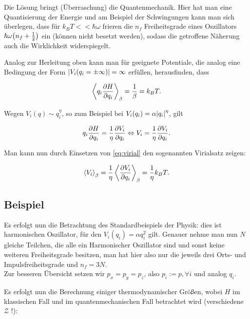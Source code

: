 \documentclass[../KlassMech_main.tex]{subfiles}
\begin{document}
Die Lösung bringt (Überraschung) die Quantenmechanik. Hier hat man eine Quantisierung der Energie und am Beispiel der Schwingungen kann man sich überlegen, dass für $k_B T << \hbar \omega$ frieren die $n_f$ Freiheitsgrade eines Oszillators $\hbar \omega \qty(n_f +\frac{1}{2})$ ein (können nicht besetzt werden), sodass die getroffene Näherung auch die Wirklichkeit widerspiegelt.


Analog zur Herleitung oben kann man für geeignete Potentiale, die analog eine Bedingung der Form $\abs{V_i(q_i = \pm\infty)} = \infty$ erfüllen, herausfinden, dass

\begin{equation}\label{eq:virial}
\expval{q_i \pdv{H}{q_i}}_\beta = \frac{1}{\beta} = k_B T .
\end{equation}

Wegen $V_i(q) \sim q_i^\eta$, so zum Beispiel bei $V_i(q_i) = \alpha \abs{q_i}^\eta$, gilt

\begin{equation}\label{key}
q_i \pdv{H}{q_i} = \frac{1}{\eta}\pdv{V_i}{q_i} \Leftrightarrow V_i = \frac{1}{\eta}\pdv{V_i}{q_i} .
\end{equation}

Man kann nun durch Einsetzen von \eqref{eq:virial} den sogenannten Virialsatz zeigen:

\begin{equation}\label{key}
\expval{V_i}_\beta = \frac{1}{\eta}\expval{\pdv{V_i}{q_i}}_\beta = \frac{1}{\eta} k_B T .
\end{equation}



	\subsection{Beispiel}
Es erfolgt nun die Betrachtung des Standardbeispiels der Physik: dies ist harmonischen Oszillator, für den $V_i(q_i) = \alpha q_i^2$ gilt. Genauer nehme man nun $N$ gleiche Teilchen, die alle ein Harmonischer Oszillator sind und sonst keine weiteren Freiheitsgrade besitzen, man hat hier also nur die jeweils drei Orts- und Impulsfreiheitsgrade und $n_f = 3N$.\medskip\\
Zur besseren Übersicht setzen wir $p_x = p_y = p_z$, also $p_i := p, \forall i$ und analog $q_i$.

Es erfolgt nun die Berechnung einiger thermodynamischer Größen, wobei $H$ im klassischen Fall und im quantenmechanischen Fall betrachtet wird (verschiedene $\mathcal{Z}$ !):
\end{document}
